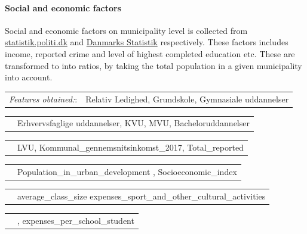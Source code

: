 \documentclass[12pt,a4paper]{article}
\begin{document}
\paragraph{Social and economic factors\newline}
Social and economic factors on municipality level is collected from \href{https://statistik.politi.dk/QvAJAXZfc/opendoc.htm?document=QlikApplication%2F2999_Public\%2FPublic_IndsatsResultater.qvw}{statistik.politi.dk} and  
\href{https://www.dst.dk/da/Statistik/emner/befolkning-og-valg}{Danmarks Statistik} respectively. These factors includes income, reported crime and level of highest completed education etc. These are transformed to into ratios, by taking the total population in a given municipality into account.   
 \vspace*{5px} \newline
\begin{tabular}{c c}
\textit{Features obtained:}: & Relativ Ledighed, Grundskole, Gymnasiale uddannelser \\	
\end{tabular}\newline 
\begin{tabular}{c c}
\qquad \qquad \qquad \qquad \quad & Erhvervsfaglige uddannelser,	 KVU, 	MVU, Bacheloruddannelser  \\	
\end{tabular}\newline 
\begin{tabular}{c c}
\qquad \qquad \qquad \qquad \quad & LVU, Kommunal\_gennemsnitsinkomst\_2017, Total\_reported\\	
\end{tabular}\newline 
\begin{tabular}{c c}
\qquad \qquad \qquad \qquad \quad & Population\_in\_urban\_development  , Socioeconomic\_index \\	
\end{tabular}\newline 
\begin{tabular}{c c}
\qquad \qquad \qquad \qquad \quad & average\_class\_size	expenses\_sport\_and\_other\_cultural\_activities	  \\	
\end{tabular}\newline 
\begin{tabular}{c c}
\qquad \qquad \qquad \qquad \quad & , expenses\_per\_school\_student	   \\	
\end{tabular}\newline 
\end{document}
